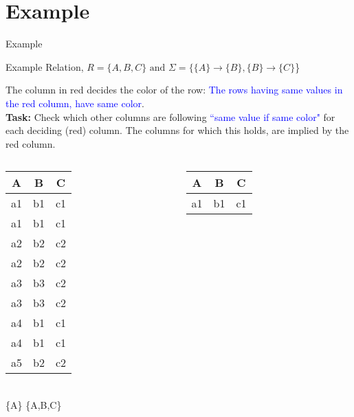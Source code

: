 \section{Example}
\begin{frame}{Example}
\small
\begin{center}
    Example Relation,  $R = \{A,B,C\} \text{ and } \Sigma =\{\{A\} \rightarrow \{B\}, \{B\} \rightarrow \{C\}$\}
\end{center}
\tiny
The column in \alert{red} decides the color of the row: \textcolor{blue}{The rows having same values in the \alert{red} column, have same color}.\\
\textbf{Task:} Check which other columns are following \textcolor{blue}{``same value if same color"} for each deciding (\alert{red}) column. The columns for which this holds, are implied by the \alert{red} column.
\footnotesize
\begin{columns}
    \begin{column}{0.32\textwidth}
        \begin{table}[t]
\centering
\begin{tabular}{ccc}
\toprule
\textbf{\alert{A}} & \textbf{B} & \textbf{C} \\
\toprule
\rowcolor{Dandelion}
a1 & b1 & c1 \\
\rowcolor{Dandelion}
a1 & b1 & c1 \\
\rowcolor{lightgray}
a2 & b2 & c2 \\
\rowcolor{lightgray}
a2 & b2 & c2 \\
\rowcolor{Thistle}
a3 & b3 & c2 \\
\rowcolor{Thistle}
a3 & b3 & c2 \\
\rowcolor{YellowGreen}
a4 & b1 & c1 \\
\rowcolor{YellowGreen}
a4 & b1 & c1 \\
a5 & b2 & c2 \\
\bottomrule
\end{tabular}\\
\pause
\{\alert{A}\} \rightarrow \{A,B,C\}
\end{table}
    \end{column}
    \pause
    \begin{column}{0.32\textwidth}
        \begin{table}[t]
\centering
\begin{tabular}{ccc}
\toprule
\textbf{A} & \textbf{\alert{B}} & \textbf{C} \\
\toprule
\rowcolor{Dandelion}
a1 & b1 & c1 \\

\end{tabular}
\end{table}
\end{column}
\end{columns}
\end{frame}
